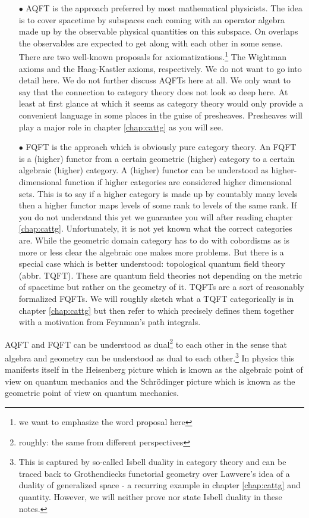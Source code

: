 \begin{enumerate}
\item[$\bullet$]
AQFT is the approach preferred by most mathematical physicists. The idea is to cover spacetime by subspaces each coming with an operator algebra made up by the observable physical quantities on this subspace. On overlaps the observables are expected to get along with each other in some sense. There are two well-known proposals for axiomatizations.\footnote{we want to emphasize the word {\glqq}proposal{\grqq} here} The Wightman axioms and the Haag-Kastler axioms, respectively. We do not want to go into detail here. We do not further discuss AQFTs here at all. We only want to say that the connection to category theory does not look so deep here. At least at first glance at which it seems as category theory would only provide a convenient language in some places in the guise of presheaves. Presheaves will play a major role in chapter \ref{chap:cattg} as you will see.
\item[$\bullet$]
FQFT is the approach which is obviously pure category theory. An FQFT is a (higher) {\glqq}functor{\grqq} from a certain geometric (higher) category to a certain algebraic (higher) category. A (higher) functor can be understood as higher-dimensional function if higher categories are considered higher dimensional sets. This is to say if a higher category is made up by countably many levels then a higher functor maps levels of some rank to levels of the same rank. If you do not understand this yet we guarantee you will after reading chapter \ref{chap:cattg}. Unfortunately, it is not yet known what the correct categories are. While the geometric domain category has to do with cobordisms as is more or less clear the algebraic one makes more problems. But there is a special case which is better understood: topological quantum field theory (abbr. TQFT). These are quantum field theories not depending on the metric of spacetime but rather on the geometry of it. TQFTs are a sort of reasonably formalized FQFTs. We will roughly sketch what a TQFT categorically is in chapter \ref{chap:cattg} but then refer to \cite{00000011} which precisely defines them together with a motivation from Feynman's path integrals.
\end{enumerate}
AQFT and FQFT can be understood as dual\footnote{roughly: the same from different perspectives} to each other in the sense that algebra and geometry can be understood as dual to each other.\footnote{This is captured by so-called Isbell duality in category theory and can be traced back to Grothendiecks functorial geometry over Lawvere's idea of a duality of generalized space - a recurring example in chapter \ref{chap:cattg} and quantity. However, we will neither prove nor state Isbell duality in these notes.} In physics this manifests itself in the Heisenberg picture which is known as the algebraic point of view on quantum mechanics and the Schr\"odinger picture which is known as the geometric point of view on quantum mechanics.

